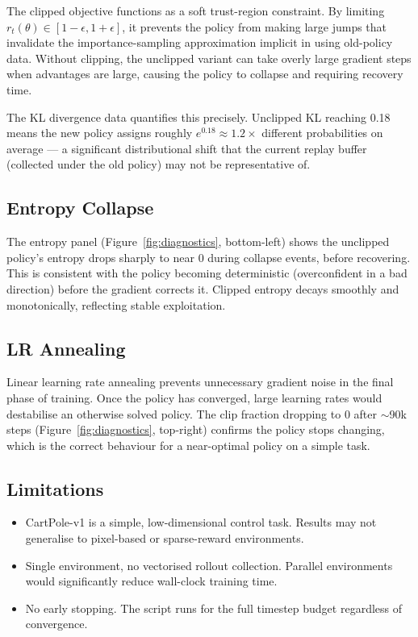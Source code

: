 \documentclass[12pt,a4paper]{article}
\begin{document}
The clipped objective functions as a soft trust-region constraint. By limiting $r_t(\theta) \in [1-\epsilon, 1+\epsilon]$, it prevents the policy from making large jumps that invalidate the importance-sampling approximation implicit in using old-policy data. Without clipping, the unclipped variant can take overly large gradient steps when advantages are large, causing the policy to collapse and requiring recovery time.

The KL divergence data quantifies this precisely. Unclipped KL reaching 0.18 means the new policy assigns roughly $e^{0.18} \approx 1.2\times$ different probabilities on average --- a significant distributional shift that the current replay buffer (collected under the old policy) may not be representative of.

\subsection{Entropy Collapse}

The entropy panel (Figure~\ref{fig:diagnostics}, bottom-left) shows the unclipped policy's entropy drops sharply to near 0 during collapse events, before recovering. This is consistent with the policy becoming deterministic (overconfident in a bad direction) before the gradient corrects it. Clipped entropy decays smoothly and monotonically, reflecting stable exploitation.

\subsection{LR Annealing}

Linear learning rate annealing prevents unnecessary gradient noise in the final phase of training. Once the policy has converged, large learning rates would destabilise an otherwise solved policy. The clip fraction dropping to 0 after $\sim$90k steps (Figure~\ref{fig:diagnostics}, top-right) confirms the policy stops changing, which is the correct behaviour for a near-optimal policy on a simple task.

\subsection{Limitations}

\begin{itemize}[noitemsep]
    \item CartPole-v1 is a simple, low-dimensional control task. Results may not generalise to pixel-based or sparse-reward environments.
    \item Single environment, no vectorised rollout collection. Parallel environments would significantly reduce wall-clock training time.
    \item No early stopping. The script runs for the full timestep budget regardless of convergence.
\end{itemize}
\end{document}
